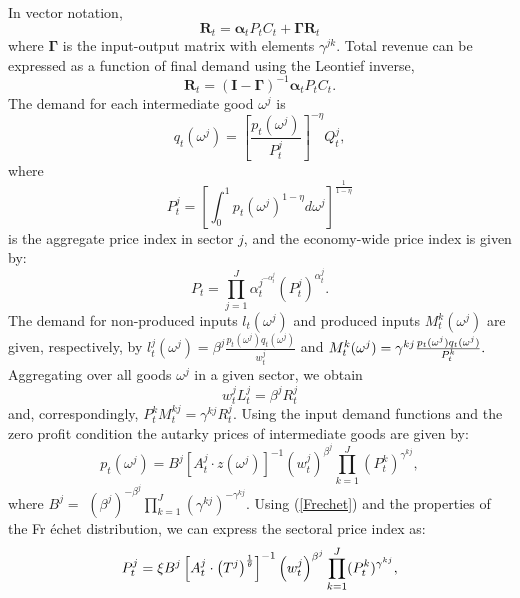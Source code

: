 \documentclass[12pt]{article}
\begin{document}
In vector notation,
\[
\mathbf R_t = \boldsymbol\alpha_t P_t C_t
 + \boldsymbol\Gamma \mathbf R_t
\]
where $\boldsymbol\Gamma$ is the input-output matrix with elements $\gamma^{jk}$. Total revenue can be expressed as a function of final demand using the Leontief inverse,
\begin{equation}
\mathbf R_t = (\mathbf I - \boldsymbol\Gamma)^{-1}\boldsymbol\alpha_t P_t C_t.
\label{QJ}
\end{equation}%
The demand for each intermediate good $\omega ^{j}$ is 
\begin{equation*}
q_{t}(\omega ^{j})=\left[ \frac{p_{t}(\omega ^{j})}{P_{t}^{j}}\right]
^{-\eta }Q_{t}^{j},
\end{equation*}%
where 
\begin{equation}
P_{t}^{j}=\left[ \int_{0}^{1}p_{t}(\omega ^{j})^{1-\eta }d\omega ^{j}\right]
^{\frac{1}{1-\eta }}  \label{PJ}
\end{equation}%
is the aggregate price index in sector $j$, and the economy-wide price index
is given by: 
\begin{equation}
P_{t}=\prod_{j=1}^{J}\alpha _{t}^{j^{-\alpha _{t}^{j}}}\left(
P_{t}^{j}\right) ^{\alpha _{t}^{j}}.  \label{Pt}
\end{equation}%
The demand for non-produced inputs $l_{t}(\omega ^{j})$ and produced inputs $%
M_{t}^k(\omega ^{j})$ are given, respectively, by $l_{t}^{j}(\omega
^{j})=\beta ^{j}\frac{p_{t}(\omega ^{j})q_{t}(\omega ^{j})}{w_{t}^{j}}$ and $%
M_{t}^k(\omega ^{j})=\gamma^{kj}\frac{p_{t}(\omega ^{j})q_{t}(\omega ^{j})}{%
P_{t}^k}.$ Aggregating over all goods $\omega ^{j}$ in a given sector, we
obtain 
\begin{equation}
w_{t}^{j}L_{t}^{j}=\beta ^{j}R_{t}^{j}  \label{Labor share}
\end{equation}%
and, correspondingly, $P_{t}^kM_{t}^{kj}=\gamma^{kj}R_{t}^{j}$.
Using the input demand functions and the zero profit condition the autarky
prices of intermediate goods are given by: 
\begin{equation}
p_{t}(\omega ^{j})=B^{j}
	\left[ A_{t}^{j}\cdot z(\omega ^{j})\right]^{-1}
	\left( w_{t}^{j}\right) ^{\beta ^{j}}
	\prod_{k=1}^J (P_{t}^k)^{\gamma^{kj}},
\label{Frechet}
\end{equation}%
where $B^{j}=$ $\left( \beta ^{j}\right) ^{-\beta ^{j}} \prod_{k=1}^J (\gamma^{kj})^{-\gamma^{kj}}$. Using (\ref{Frechet}) and the properties of the Fr%
\'{e}chet distribution, we can express the sectoral price index as: 
\begin{equation}
P_{t}^{j}=\xi B^{j}
	\left[ A_{t}^{j}\cdot \left( T^{j}\right) ^{\frac{1}{%
		\theta }}\right] ^{-1}
	\left( w_{t}^{j}\right) ^{\beta ^{j}}
	\prod_{k=1}^J (P_{t}^k)^{\gamma^{kj}},
\end{equation}%
\end{document}
